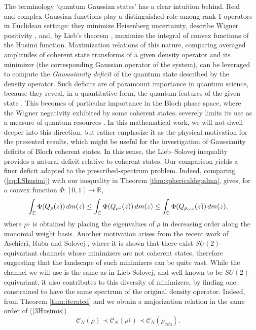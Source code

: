 \documentclass[12pt]{amsart}
\theoremstyle{plain}
\theoremstyle{definition}
\theoremstyle{remark}
\numberwithin{equation}{section}
\newcommand{\1}{\mathbf 1}
\begin{document}
The terminology `quantum Gaussian states' has a clear intuition behind. Real
and complex Gaussian functions play a distinguished role among rank-$1$
operators in Euclidean settings: they minimize Heisenberg uncertainty,
describe Wigner positivity \cite{Hudson}, and, by Lieb's theorem \cite%
{Lieb1978}, maximize the integral of convex functions of the Husimi
function. Maximization relations of this nature, comparing averaged
amplitudes of coherent state transforms of a given density operator and its
minimizer (the corresponding Gaussian operator of the system), can be
leveraged to compute the \emph{Gausssianity deficit }of the quantum state
described by the density operator. Such deficits are of paramount importance
in quantum science, because they reveal, in a quantitative form, the quantum
features of the given state \cite{DPTGA,Stellar}. This becomes of particular
importance in the Bloch phase space, where the Wigner negativity exhibited
by some coherent states, severely limits its use as a measure of quantum
resources \cite{WignerSU2}. In this mathematical work, we will not dwell
deeper into this direction, but rather emphasize it as the physical
motivation for the presented results, which might be useful for the
investigation of Gaussianity deficits of Bloch coherent states. In this
sense, the Lieb--Solovej inequality provides a natural deficit relative to
coherent states. Our comparison yields a finer deficit adapted to the
prescribed-spectrum problem. Indeed, comparing (\ref{eq:LShusimi}) with our
inequality in Theorem \ref{thm:sphericaldepalma}, gives, for a convex
function $\Phi :[0,1]\rightarrow \mathbb{R}$, 
\begin{equation}
\int_{\mathbb{C}}\Phi (Q_{\rho }(z))\,dm(z)\leq \int_{\mathbb{C}}\Phi
(Q_{\rho ^{\downarrow }}(z))\,dm(z)\leq \int_{\mathbb{C}}\Phi (Q_{\rho _{%
\mathrm{coh}}}(z))\,dm(z)\text{,}  \label{3Husimis}
\end{equation}%
where $\rho ^{\downarrow }$ is obtained by placing the eigenvalues of $\rho $
in decreasing order along the monomial weight basis. Another motivation
arises from the recent work of Aschieri, Ruba and Solovej \cite{Aschieri},
where it is shown that there exist $SU(2)$-equivariant channels whose
minimizers are not coherent states, therefore suggesting that the landscape
of such minimizers can be quite vast. While the channel we will use is the
same as in Lieb-Solovej, and well known to be $SU(2)$-equivariant, it also
contributes to this diversity of minimizers, by finding one constrained to
have the same spectrum of the original density operator. Indeed, from
Theorem \ref{thm:iterated} and \cite[Theorem 2.4]{LiebSolovej} we obtain a
majorization relation in the same order of (\ref{3Husimis}) 
\begin{equation*}
\mathcal{C}_{N}(\rho )\prec \mathcal{C}_{N}(\rho ^{\downarrow })\prec 
\mathcal{C}_{N}(\rho _{\mathrm{coh}})\text{.}
\end{equation*}
\end{document}
